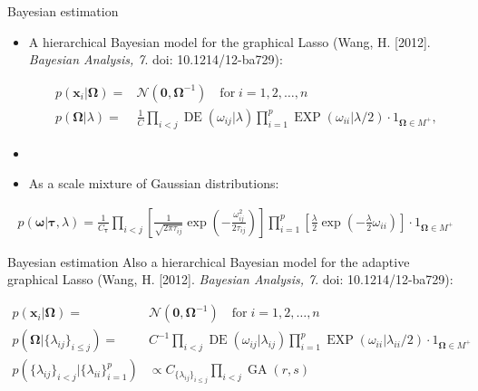 \documentclass[xcolor=dvipsnames]{beamer}
\DeclareMathOperator{\DE}{DE}
\DeclareMathOperator{\EXP}{EXP}
\DeclareMathOperator{\GA}{GA}
\begin{document}
\begin{frame}{Bayesian estimation}
	\vspace{-5.5pt}
\begin{itemize}
	\item A hierarchical Bayesian model for the graphical Lasso (Wang, H. [2012]. \emph{Bayesian Analysis, 7}. doi: 10.1214/12-ba729): 
	
		\begin{align*}
		p(\textbf{x}_i|\boldsymbol{\Omega}) =& \mathcal{N}(\textbf{0},\boldsymbol{\Omega}^{-1}) \quad \text{for} \; i=1,2,\hdots,n\\
		p(\boldsymbol{\Omega}|\lambda) =& \frac{1}{C} \prod_{i<j} \DE(\omega_{ij}|\lambda) \prod_{i=1}^{p} \EXP (\omega_{ii} | \lambda / 2) \cdot 1_{\boldsymbol{\Omega}\in M^+},
		\end{align*} \pause
	\item[]
	\item As a scale mixture of Gaussian distributions:
\end{itemize}
		\begin{align*}
		p(\boldsymbol{\omega}| \boldsymbol{\tau},\lambda)=\frac{1}{C_{\boldsymbol{\tau}}} \prod_{i<j} \left[ \frac{1}{\sqrt{2\pi \tau_{ij}}} \exp \left(- \frac{\omega_{ij}^2}{2\tau_{ij}}\right) \right] 
		\prod_{i=1}^{p}  \left[\frac{\lambda}{2} \exp \left(-\frac{\lambda}{2}\omega_{ii} \right)\right] \cdot 1_{\boldsymbol{\Omega}\in M^+}
		\end{align*}
\end{frame}

\begin{frame}{Bayesian estimation}
	\vspace{-15.5pt}
	Also a hierarchical Bayesian model for the adaptive graphical Lasso (Wang, H. [2012]. \emph{Bayesian Analysis, 7}. doi: 10.1214/12-ba729):
	
	\begin{align*}
	p(\mathbf{x}_i|\boldsymbol{\Omega}) = & \mathcal{N}(\mathbf{0,\boldsymbol{\Omega}}^{-1}) \quad \text{for} \; i=1,2,\hdots,n\\
	p(\boldsymbol{\Omega}|\{\lambda_{ij}\}_{i\leq j}) = & C^{-1} \prod_{i<j} \DE(\omega_{ij}|\lambda_{ij}) \prod_{i=1}^{p} \EXP (\omega_{ii} | \lambda_{ii} / 2) \cdot 1_{\boldsymbol{\Omega}\in M^+}\\
	p(\{\lambda_{ij}\}_{i<j}|\{\lambda_{ii}\}_{i=1}^p) &\propto C_{\{\lambda_{ij}\}_{i\leq j}} \prod_{i<j} \GA(r,s)
	\end{align*}
\end{frame}
\end{document}
